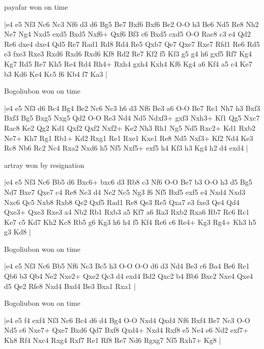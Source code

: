 \showboard

payafar won on time

\makegametitle
|e4 e5 Nf3 Nc6 Nc3 Nf6 d3 d6 Bg5 Be7 Bxf6 Bxf6 Be2 O-O h3 Be6 Nd5 Re8 Nh2 Ne7 Ng4 Nxd5 exd5 Bxd5 Nxf6+ Qxf6 Bf3 c6 Bxd5 cxd5 O-O Rac8 c3 e4 Qd2 Re6 dxe4 dxe4 Qd5 Re7 Rad1 Rd8 Rd4 Re5 Qxb7 Qe7 Qxe7 Rxe7 Rfd1 Re6 Rd5 e3 fxe3 Rxe3 Rxd6 Rxd6 Rxd6 Kf8 Rd2 Re7 Kf2 f5 Kf3 g5 g4 h6 gxf5 Rf7 Kg4 Kg7 Rd5 Re7 Kh5 Re4 Rd4 Rh4+ Rxh4 gxh4 Kxh4 Kf6 Kg4 a6 Kf4 a5 c4 Ke7 b3 Kd6 Ke4 Kc5 f6 Kb4 f7 Ka3  |

\showboard

Bogoliubon won on time

\makegametitle
|e4 e5 Nf3 d6 Bc4 Bg4 Be2 Nc6 Nc3 h6 d3 Nf6 Be3 a6 O-O Be7 Re1 Nh7 h3 Bxf3 Bxf3 Bg5 Bxg5 Nxg5 Qd2 O-O Re3 Nd4 Nd5 Ndxf3+ gxf3 Nxh3+ Kf1 Qg5 Nxc7 Rac8 Ke2 Qg2 Kd1 Qxf2 Qxf2 Nxf2+ Ke2 Nh3 Rh1 Ng5 Nd5 Rxc2+ Kd1 Rxb2 Ne7+ Kh7 Rg1 Rb1+ Kd2 Rxg1 Re1 Rxe1 Kxe1 Re8 Nd5 Nxf3+ Kf2 Nd4 Ke3 Rc8 Nb6 Rc2 Nc4 Rxa2 Nxd6 h5 Nf5 Nxf5+ exf5 h4 Kf3 h3 Kg4 h2 d4 exd4  |

\showboard

artray won by resignation

\makegametitle
|e4 e5 Nf3 Nc6 Bb5 d6 Bxc6+ bxc6 d3 Rb8 c3 Nf6 O-O Be7 b3 O-O h3 d5 Bg5 Nd7 Bxe7 Qxe7 c4 Re8 Nc3 d4 Ne2 Nc5 Ng3 f6 Nf5 Bxf5 exf5 e4 Nxd4 Nxd3 Nxc6 Qc5 Nxb8 Rxb8 Qe2 Qxf5 Rad1 Re8 Qe3 Re5 Qxa7 e3 fxe3 Qe4 Qd4 Qxe3+ Qxe3 Rxe3 a4 Nb2 Rb1 Rxb3 a5 Kf7 a6 Ra3 Rxb2 Rxa6 Rb7 Rc6 Rc1 Ke7 c5 Kd7 Kh2 Kc8 Rb5 g6 Kg3 h6 h4 f5 Kf4 Re6 c6 Re4+ Kg3 Rg4+ Kh3 h5 g3 Kd8  |

\showboard

Bogoliubon won on time

\makegametitle
|e4 e5 Nf3 Nc6 Bb5 Nf6 Nc3 Bc5 h3 O-O O-O d6 d3 Nd4 Be3 c6 Ba4 Be6 Re1 Qb6 b3 Qb4 Ne2 Nxe2+ Qxe2 Qc3 d4 exd4 Bd2 Qxc2 b4 Bb6 Bxc2 Nxe4 Qxe4 d5 Qe2 Rfe8 Nxd4 Bxd4 Be3 Bxa1 Rxa1  |

\showboard

Bogoliubon won on time

\makegametitle
|e4 e5 f4 exf4 Nf3 Nc6 Bc4 d6 d4 Bg4 O-O Nxd4 Qxd4 Nf6 Bxf4 Be7 Nc3 O-O Nd5 c6 Nxe7+ Qxe7 Bxd6 Qd7 Bxf8 Qxd4+ Nxd4 Rxf8 e5 Ne4 e6 Nd2 exf7+ Kh8 Rf4 Nxc4 Rxg4 Rxf7 Re1 Rf8 Re7 Nd6 Rgxg7 Nf5 Rxh7+ Kg8  |

